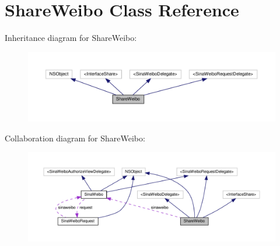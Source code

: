 \hypertarget{interfaceShareWeibo}{}\section{Share\+Weibo Class Reference}
\label{interfaceShareWeibo}


Inheritance diagram for Share\+Weibo\+:
\nopagebreak
\begin{figure}[H]
\begin{center}
\leavevmode
\includegraphics[width=350pt]{interfaceShareWeibo__inherit__graph}
\end{center}
\end{figure}


Collaboration diagram for Share\+Weibo\+:
\nopagebreak
\begin{figure}[H]
\begin{center}
\leavevmode
\includegraphics[width=350pt]{interfaceShareWeibo__coll__graph}
\end{center}
\end{figure}
